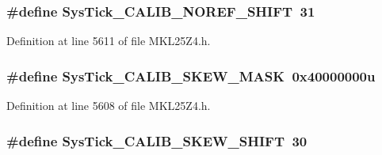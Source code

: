 \subsubsection[{\texorpdfstring{Sys\+Tick\+\_\+\+C\+A\+L\+I\+B\+\_\+\+N\+O\+R\+E\+F\+\_\+\+S\+H\+I\+FT}{SysTick_CALIB_NOREF_SHIFT}}]{\setlength{\rightskip}{0pt plus 5cm}\#define Sys\+Tick\+\_\+\+C\+A\+L\+I\+B\+\_\+\+N\+O\+R\+E\+F\+\_\+\+S\+H\+I\+FT~31}\hypertarget{group___sys_tick___register___masks_ga957057ddf04b20227820b1343b08a302}{}\label{group___sys_tick___register___masks_ga957057ddf04b20227820b1343b08a302}


Definition at line 5611 of file M\+K\+L25\+Z4.\+h.

\subsubsection[{\texorpdfstring{Sys\+Tick\+\_\+\+C\+A\+L\+I\+B\+\_\+\+S\+K\+E\+W\+\_\+\+M\+A\+SK}{SysTick_CALIB_SKEW_MASK}}]{\setlength{\rightskip}{0pt plus 5cm}\#define Sys\+Tick\+\_\+\+C\+A\+L\+I\+B\+\_\+\+S\+K\+E\+W\+\_\+\+M\+A\+SK~0x40000000u}\hypertarget{group___sys_tick___register___masks_gaade570cf5b9c0a8da6e1215de8db8d82}{}\label{group___sys_tick___register___masks_gaade570cf5b9c0a8da6e1215de8db8d82}


Definition at line 5608 of file M\+K\+L25\+Z4.\+h.

\subsubsection[{\texorpdfstring{Sys\+Tick\+\_\+\+C\+A\+L\+I\+B\+\_\+\+S\+K\+E\+W\+\_\+\+S\+H\+I\+FT}{SysTick_CALIB_SKEW_SHIFT}}]{\setlength{\rightskip}{0pt plus 5cm}\#define Sys\+Tick\+\_\+\+C\+A\+L\+I\+B\+\_\+\+S\+K\+E\+W\+\_\+\+S\+H\+I\+FT~30}\hypertarget{group___sys_tick___register___masks_ga12bc3aae96690bf88f38e0bf46aa3d8b}{}\label{group___sys_tick___register___masks_ga12bc3aae96690bf88f38e0bf46aa3d8b}


